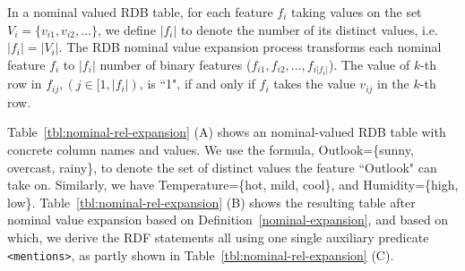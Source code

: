 \begin{mydef}
\label{nominal-expansion}
In a nominal valued RDB table, for each feature $f_i$ taking values on the set $V_i=\{v_{i1}, v_{i2}, \ldots\}$, we define $|f_i|$ to denote the number of its distinct values, i.e. $|f_i|=|V_i|$. The RDB nominal value expansion process transforms each nominal feature $f_i$ to $|f_i|$ number of binary features ($f_{i1}, f_{i2}, \ldots, f_{i|f_i|}$). The value of $k$-th row in $f_{ij}, (j\in [1, |f_i|)$, is ``1", if and only if $f_i$ takes the value $v_{ij}$ in the $k$-th row.
\end{mydef}

\begin{myexp}
Table~\ref{tbl:nominal-rel-expansion} (A) shows an nominal-valued RDB table with concrete column names and values. We use the formula, Outlook=\{sunny, overcast, rainy\}, to denote the set of distinct values the feature ``Outlook" can take on. Similarly, we have Temperature=\{hot, mild, cool\}, and Humidity=\{high, low\}. Table~\ref{tbl:nominal-rel-expansion} (B) shows the resulting table after nominal value expansion based on Definition~\ref{nominal-expansion}, and based on which, we derive the RDF statements all using one single auxiliary predicate \texttt{<mentions>}, as partly shown in Table~\ref{tbl:nominal-rel-expansion} (C).
\end{myexp}

